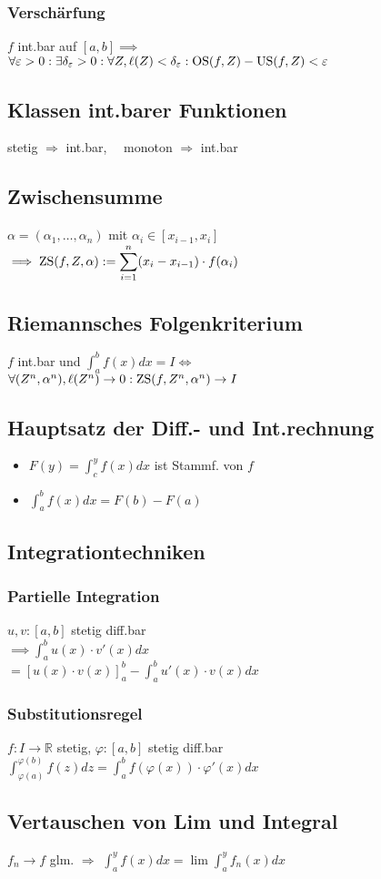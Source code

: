 \subsubsection*{Verschärfung}
$f$ int.bar auf $[a,b] \implies$ \\
$\forall \varepsilon>0:\exists \delta_\varepsilon>0: \forall Z, \ell(Z)<\delta_\varepsilon: \operatorname{OS}(f,Z)-\operatorname{US}(f,Z)<\varepsilon$

\subsection*{Klassen int.barer Funktionen}
stetig $\Rightarrow$ int.bar,~~
monoton $\Rightarrow$ int.bar

\subsection*{Zwischensumme}
$\alpha=(\alpha_1,\ldots,\alpha_n)$ mit $\alpha_i\in[x_{i-1},x_i]$ \\
$\displaystyle \implies \operatorname{ZS}(f,Z,\alpha) := \sum_{i=1}^n(x_i-x_{i-1})\cdot f(\alpha_i)$

\subsection*{Riemannsches Folgenkriterium}
$f$ int.bar und $\int_a^bf(x)dx=I \iff$ \\
$\forall(Z^n,\alpha^n), \ell(Z^n)\to0: \operatorname{ZS}(f,Z^n,\alpha^n)\to I$

\subsection*{Hauptsatz der Diff.- und Int.rechnung}
\begin{itemize}
	\item $F(y)=\int_c^yf(x)dx$ ist Stammf. von $f$
	\item $\int_a^bf(x)dx=F(b)-F(a)$
\end{itemize}

\subsection*{Integrationtechniken}

\subsubsection*{Partielle Integration}
$u,v:[a,b]$ stetig diff.bar \\
$\implies \int_a^bu(x)\cdot v'(x)dx$\\ $= [u(x)\cdot v(x)]_a^b - \int_a^bu'(x)\cdot v(x)dx$

\subsubsection*{Substitutionsregel}
$f:I\to\mathbb{R}$ stetig, $\varphi:[a,b]$ stetig diff.bar \\
$\int_{\varphi(a)}^{\varphi(b)}f(z)dz = \int_a^bf(\varphi(x))\cdot\varphi'(x)dx$

\subsection*{Vertauschen von Lim und Integral}
$f_n\to f$ glm. $\Rightarrow$
$\int_a^yf(x)dx=\lim\int_a^yf_n(x)dx$
